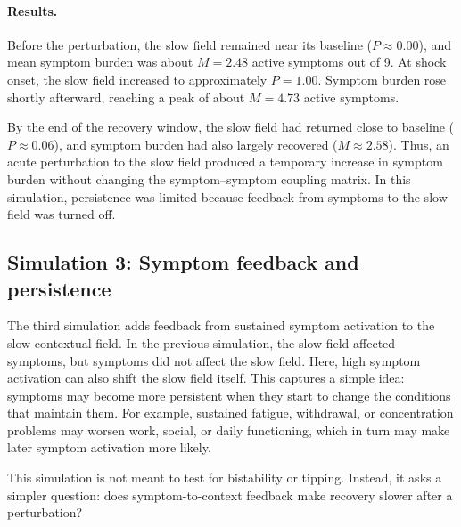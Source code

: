 \paragraph{Results.}
Before the perturbation, the slow field remained near its baseline
(\(P\approx 0.00\)), and mean symptom burden was about \(M=2.48\) active
symptoms out of 9. At shock onset, the slow field increased to approximately
\(P=1.00\). Symptom burden rose shortly afterward, reaching a peak of about
\(M=4.73\) active symptoms.

By the end of the recovery window, the slow field had returned close to
baseline (\(P\approx 0.06\)), and symptom burden had also largely recovered
(\(M\approx 2.58\)). Thus, an acute perturbation to the slow field produced a
temporary increase in symptom burden without changing the symptom--symptom
coupling matrix. In this simulation, persistence was limited because feedback
from symptoms to the slow field was turned off.




\subsection{Simulation 3: Symptom feedback and persistence}

The third simulation adds feedback from sustained symptom activation to the
slow contextual field. In the previous simulation, the slow field affected
symptoms, but symptoms did not affect the slow field. Here, high symptom
activation can also shift the slow field itself. This captures a simple idea:
symptoms may become more persistent when they start to change the conditions
that maintain them. For example, sustained fatigue, withdrawal, or
concentration problems may worsen work, social, or daily functioning, which in
turn may make later symptom activation more likely.

This simulation is not meant to test for bistability or tipping. Instead, it
asks a simpler question: does symptom-to-context feedback make recovery slower
after a perturbation?

